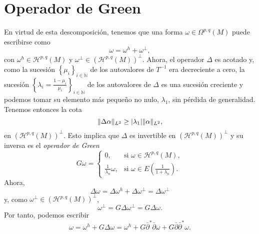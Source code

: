 \documentclass[12pt,a4paper]{article}
\theoremstyle{definition} \newtheorem{defn}[thm]{Definición}
\theoremstyle{definition} \newtheorem{ejemplo}[thm]{Ejemplo}
\theoremstyle{definition} \newtheorem{ejercicio}[thm]{Ejercicio}
\theoremstyle{remark} \newtheorem*{obs}{Observación}
\DeclarePairedDelimiter\norm{\lVert}{\rVert}
\newcommand{\dol}{\bar{\partial}}
\newcommand{\NN}{\mathbb{N}}
\begin{document}
    \section{Operador de Green}
    En virtud de esta descomposición, tenemos que una forma $\omega \in \Omega^{p,q}(M)$ puede escribirse como 
    \begin{equation*}
      \omega=\omega^h + \omega^{\perp},
    \end{equation*}
    con $\omega^h\in \mathcal{H}^{p,q}(M)$ y $\omega^{\perp} \in (\mathcal{H}^{p,q}(M))^{\perp}$. Ahora, el operador $\Delta$ es acotado y, como la sucesión $\left\{ \mu_i \right\}_{i\in \NN}$ de los autovalores de $T^{-1}$ era decreciente a cero, la sucesión $\left\{ \lambda_i=\frac{1-\mu_i}{\mu_i} \right\}_{i\in \NN}$ de los autovalores de $\Delta$ es una sucesión creciente y podemos tomar su elemento más pequeño no nulo, $\lambda_1$, sin pérdida de generalidad. Tenemos entonces la cota
    \begin{equation*}
      \norm{\Delta \alpha}_{L^2} \geq |\lambda_1| \norm{\alpha}_{L^2},
    \end{equation*}
    en $(\mathcal{H}^{p,q}(M))^{\perp}$.
    Esto implica que $\Delta$ es invertible en $(\mathcal{H}^{p,q}(M))^{\perp}$ y su inversa es el \emph{operador de Green}
    \begin{equation*}
      G\omega = 
      \begin{cases}
	0, & \text{si } \omega \in \mathcal{H}^{p,q}(M), \\
	\frac{1}{\lambda_n}\omega, & \text{si } \omega \in E(\frac{1}{1+\lambda_n}).
      \end{cases}
    \end{equation*}
    Ahora,
    \begin{equation*}
      \Delta \omega = \Delta \omega^h + \Delta \omega^\perp = \Delta \omega^\perp
    \end{equation*}
    y, como $\omega^\perp \in (\mathcal{H}^{p,q}(M))^{\perp}$, 
    \begin{equation*}
      \omega^\perp=G\Delta \omega^\perp=G \Delta \omega.
    \end{equation*}
    Por tanto, podemos escribir
    \begin{equation*}
      \omega = \omega^h + G\Delta \omega = \omega^h + G\dol^*\dol\omega + G\dol \dol^*\omega.
    \end{equation*}
    
\end{document}
